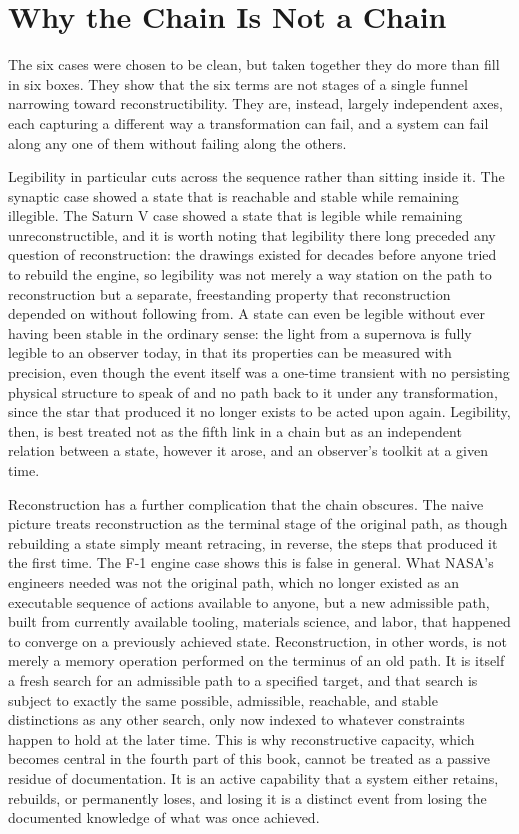 \documentclass[11pt]{book}
\begin{document}
\section{Why the Chain Is Not a Chain}

The six cases were chosen to be clean, but taken together they do more than fill in six boxes. They show that the six terms are not stages of a single funnel narrowing toward reconstructibility. They are, instead, largely independent axes, each capturing a different way a transformation can fail, and a system can fail along any one of them without failing along the others.

Legibility in particular cuts across the sequence rather than sitting inside it. The synaptic case showed a state that is reachable and stable while remaining illegible. The Saturn V case showed a state that is legible while remaining unreconstructible, and it is worth noting that legibility there long preceded any question of reconstruction: the drawings existed for decades before anyone tried to rebuild the engine, so legibility was not merely a way station on the path to reconstruction but a separate, freestanding property that reconstruction depended on without following from. A state can even be legible without ever having been stable in the ordinary sense: the light from a supernova is fully legible to an observer today, in that its properties can be measured with precision, even though the event itself was a one-time transient with no persisting physical structure to speak of and no path back to it under any transformation, since the star that produced it no longer exists to be acted upon again. Legibility, then, is best treated not as the fifth link in a chain but as an independent relation between a state, however it arose, and an observer's toolkit at a given time.

Reconstruction has a further complication that the chain obscures. The naive picture treats reconstruction as the terminal stage of the original path, as though rebuilding a state simply meant retracing, in reverse, the steps that produced it the first time. The F-1 engine case shows this is false in general. What NASA's engineers needed was not the original path, which no longer existed as an executable sequence of actions available to anyone, but a new admissible path, built from currently available tooling, materials science, and labor, that happened to converge on a previously achieved state. Reconstruction, in other words, is not merely a memory operation performed on the terminus of an old path. It is itself a fresh search for an admissible path to a specified target, and that search is subject to exactly the same possible, admissible, reachable, and stable distinctions as any other search, only now indexed to whatever constraints happen to hold at the later time. This is why reconstructive capacity, which becomes central in the fourth part of this book, cannot be treated as a passive residue of documentation. It is an active capability that a system either retains, rebuilds, or permanently loses, and losing it is a distinct event from losing the documented knowledge of what was once achieved.
\end{document}
